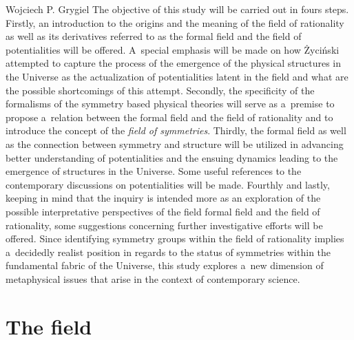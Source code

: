 \begin{artengenv}{Wojciech P. Grygiel}
The objective of this study will be carried out in fours steps. Firstly, an introduction to the origins and the meaning of the field of rationality as well as its derivatives referred to as the formal field and the field of potentialities will be offered. A~special emphasis will be made on how Życiński attempted to capture the process of the emergence of the physical structures in the Universe as the actualization of potentialities latent in the field and what are the possible shortcomings of this attempt. Secondly, the specificity of the formalisms of the symmetry based physical theories will serve as a~premise to propose a~relation between the formal field and the field of rationality and to introduce the concept of the \textit{field of symmetries}. Thirdly, the formal field as well as the connection between symmetry and structure will be utilized in advancing better understanding of potentialities and the ensuing dynamics leading to the emergence of structures in the Universe. Some useful references to the contemporary discussions on potentialities will be made. Fourthly and lastly, keeping in mind that the inquiry is intended more as an exploration of the possible interpretative perspectives of the field formal field and the field of rationality, some suggestions concerning further investigative efforts will be offered. Since identifying symmetry groups within the field of rationality implies a~decidedly realist position in regards to the status of symmetries within the fundamental fabric of the Universe, this study explores a~new dimension of metaphysical issues that arise in the context of contemporary science.



\section*{The field}


\end{artengenv}

